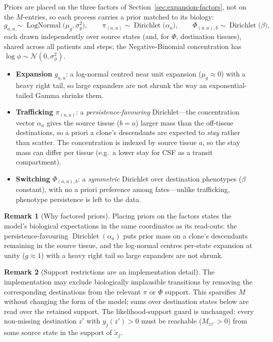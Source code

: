 \documentclass[11pt]{article}
\DeclareMathOperator{\Dir}{Dirichlet}
\theoremstyle{definition}
\newtheorem*{remark}{Remark}
\begin{document}
Priors are placed on the three factors of Section~\ref{sec:expansion-factors},
not on the $M$-entries, so each process carries a prior matched to its biology:
\[
  g_{a,u} \sim \operatorname{LogNormal}\!\bigl(\mu_g,\sigma_g^2\bigr),
  \qquad
  \pi_{(a,u)} \sim \Dir\!\bigl(\alpha_a\bigr),
  \qquad
  \Phi_{(a,u),b} \sim \Dir\!\bigl(\beta\bigr),
\]
each drawn independently over source states (and, for $\Phi$, destination
tissues), shared across all patients and steps; the Negative-Binomial
concentration has $\log\phi \sim \mathcal{N}(0,\sigma_\phi^2)$.
\begin{itemize}[leftmargin=1.4em, itemsep=2pt]
  \item \textbf{Expansion} $g_{a,u}$: a log-normal centred near unit expansion
        ($\mu_g\approx 0$) with a heavy right tail, so large expanders are not
        shrunk the way an exponential-tailed Gamma shrinks them.
  \item \textbf{Trafficking} $\pi_{(a,u)}$: a \emph{persistence-favouring}
        Dirichlet---the concentration vector $\alpha_a$ gives the source tissue
        ($b=a$) larger mass than the off-tissue destinations, so a priori a
        clone's descendants are expected to \emph{stay} rather than scatter. The
        concentration is indexed by source tissue $a$, so the stay mass can differ
        per tissue (e.g.\ a lower stay for CSF as a transit compartment).
  \item \textbf{Switching} $\Phi_{(a,u),b}$: a \emph{symmetric} Dirichlet over
        destination phenotypes ($\beta$ constant), with no a priori preference among
        fates---unlike trafficking, phenotype persistence is left to the data.
\end{itemize}

\begin{remark}[Why factored priors]
Placing priors on the factors states the model's biological expectations in the
same coordinates as its read-outs: the persistence-favouring $\Dir(\alpha_a)$ puts
prior mass on a clone's descendants remaining in the source tissue, and the
log-normal centres per-state expansion at unity ($g\approx 1$) with a heavy right
tail so large expanders are not shrunk.
\end{remark}

\begin{remark}[Support restrictions are an implementation detail]
The implementation may exclude biologically implausible transitions by removing
the corresponding destinations from the relevant $\pi$ or $\Phi$ support. This
sparsifies $M$ without changing the form of the model; sums over destination
states below are read over the retained support. The likelihood-support guard is
unchanged: every non-missing destination $z'$ with $y_j(z')>0$ must be reachable
($M_{zz'}>0$) from some source state in the support of $\tilde{x}_j$.
\end{remark}
\end{document}
